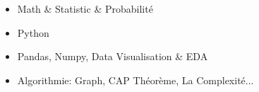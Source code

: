 \documentclass[10pt,a4paper]{altacv}
\begin{document}


%






\begin{itemize}
    \item Math \& Statistic \& Probabilité
    \item Python
    \item Pandas, Numpy, Data Visualisation \& EDA
    \item Algorithmie: Graph, CAP Théorème, La Complexité...
\end{itemize}
\end{document}

